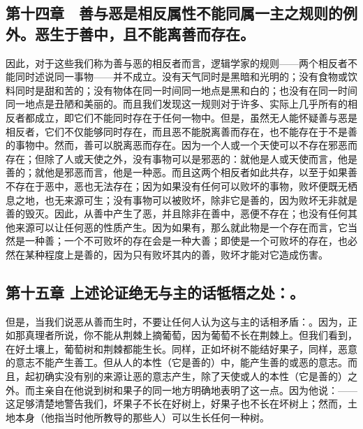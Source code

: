 
\subsection{第十四章　善与恶是相反属性不能同属一主之规则的例外。恶生于善中，且不能离善而存在。}

因此，对于这些我们称为善与恶的相反者而言，逻辑学家的规则——两个相反者不能同时述说同一事物——并不成立。没有天气同时是黑暗和光明的；没有食物或饮料同时是甜和苦的；没有物体在同一时间同一地点是黑和白的；也没有在同一时间同一地点是丑陋和美丽的。而且我们发现这一规则对于许多、实际上几乎所有的相反者都成立，即它们不能同时存在于任何一物中。但是，虽然无人能怀疑善与恶是相反者，它们不仅能够同时存在，而且恶不能脱离善而存在，也不能存在于不是善的事物中。然而，善可以脱离恶而存在。因为一个人或一个天使可以不存在邪恶而存在；但除了人或天使之外，没有事物可以是邪恶的：就他是人或天使而言，他是善的；就他是邪恶而言，他是一种恶。而且这两个相反者如此共存，以至于如果善不存在于恶中，恶也无法存在；因为如果没有任何可以败坏的事物，败坏便既无栖息之地，也无来源可生；没有事物可以被败坏，除非它是善的，因为败坏无非就是善的毁灭。因此，从善中产生了恶，并且除非在善中，恶便不存在；也没有任何其他来源可以让任何恶的性质产生。因为如果有，那么就此物是一个存在而言，它当然是一种善；一个不可败坏的存在会是一种大善；即使是一个可败坏的存在，也必然在某种程度上是善的，因为只有败坏其内的善，败坏才能对它造成伤害。\par


\subsection{第十五章 上述论证绝无与主的话牴牾之处：。}

但是，当我们说恶从善而生时，不要让任何人认为这与主的话相矛盾：。因为，正如那真理者所说，你不能从荆棘上摘葡萄，因为葡萄不长在荆棘上。但我们看到，在好土壤上，葡萄树和荆棘都能生长。同样，正如坏树不能结好果子，同样，恶意的意志不能产生善工。但从人的本性（它是善的）中，能产生善的或恶的意志。而且，起初确实没有别的来源让恶的意志产生，除了天使或人的本性（它是善的）之外。而主亲自在他说到树和果子的同一地方明确地表明了这一点。因为他说：——这足够清楚地警告我们，坏果子不长在好树上，好果子也不长在坏树上；然而，土地本身（他指当时他所教导的那些人）可以生长任何一种树。\par

